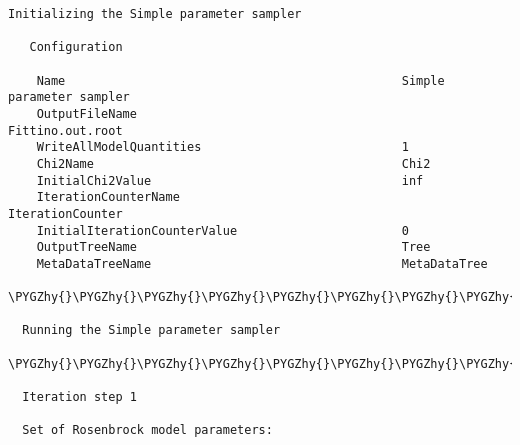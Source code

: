 \documentclass[letterpaper,10pt,english]{sphinxmanual}
\def\PYGZhy{\char`\-}
\begin{document}
\begin{Verbatim}[commandchars=\\\{\}]
  Initializing the Simple parameter sampler

   Configuration

    Name                                               Simple parameter sampler
    OutputFileName                                     Fittino.out.root
    WriteAllModelQuantities                            1
    Chi2Name                                           Chi2
    InitialChi2Value                                   inf
    IterationCounterName                               IterationCounter
    InitialIterationCounterValue                       0
    OutputTreeName                                     Tree
    MetaDataTreeName                                   MetaDataTree

\PYGZhy{}\PYGZhy{}\PYGZhy{}\PYGZhy{}\PYGZhy{}\PYGZhy{}\PYGZhy{}\PYGZhy{}\PYGZhy{}\PYGZhy{}\PYGZhy{}\PYGZhy{}\PYGZhy{}\PYGZhy{}\PYGZhy{}\PYGZhy{}\PYGZhy{}\PYGZhy{}\PYGZhy{}\PYGZhy{}\PYGZhy{}\PYGZhy{}\PYGZhy{}\PYGZhy{}\PYGZhy{}\PYGZhy{}\PYGZhy{}\PYGZhy{}\PYGZhy{}\PYGZhy{}\PYGZhy{}\PYGZhy{}\PYGZhy{}\PYGZhy{}\PYGZhy{}\PYGZhy{}\PYGZhy{}\PYGZhy{}\PYGZhy{}\PYGZhy{}\PYGZhy{}\PYGZhy{}\PYGZhy{}\PYGZhy{}\PYGZhy{}\PYGZhy{}\PYGZhy{}\PYGZhy{}\PYGZhy{}\PYGZhy{}\PYGZhy{}\PYGZhy{}\PYGZhy{}\PYGZhy{}\PYGZhy{}\PYGZhy{}\PYGZhy{}\PYGZhy{}\PYGZhy{}\PYGZhy{}\PYGZhy{}\PYGZhy{}\PYGZhy{}\PYGZhy{}\PYGZhy{}\PYGZhy{}\PYGZhy{}\PYGZhy{}\PYGZhy{}\PYGZhy{}\PYGZhy{}\PYGZhy{}\PYGZhy{}\PYGZhy{}\PYGZhy{}\PYGZhy{}\PYGZhy{}\PYGZhy{}\PYGZhy{}\PYGZhy{}\PYGZhy{}\PYGZhy{}\PYGZhy{}\PYGZhy{}\PYGZhy{}\PYGZhy{}\PYGZhy{}

  Running the Simple parameter sampler

\PYGZhy{}\PYGZhy{}\PYGZhy{}\PYGZhy{}\PYGZhy{}\PYGZhy{}\PYGZhy{}\PYGZhy{}\PYGZhy{}\PYGZhy{}\PYGZhy{}\PYGZhy{}\PYGZhy{}\PYGZhy{}\PYGZhy{}\PYGZhy{}\PYGZhy{}\PYGZhy{}\PYGZhy{}\PYGZhy{}\PYGZhy{}\PYGZhy{}\PYGZhy{}\PYGZhy{}\PYGZhy{}\PYGZhy{}\PYGZhy{}\PYGZhy{}\PYGZhy{}\PYGZhy{}\PYGZhy{}\PYGZhy{}\PYGZhy{}\PYGZhy{}\PYGZhy{}\PYGZhy{}\PYGZhy{}\PYGZhy{}\PYGZhy{}\PYGZhy{}\PYGZhy{}\PYGZhy{}\PYGZhy{}\PYGZhy{}\PYGZhy{}\PYGZhy{}\PYGZhy{}\PYGZhy{}\PYGZhy{}\PYGZhy{}\PYGZhy{}\PYGZhy{}\PYGZhy{}\PYGZhy{}\PYGZhy{}\PYGZhy{}\PYGZhy{}\PYGZhy{}\PYGZhy{}\PYGZhy{}\PYGZhy{}\PYGZhy{}\PYGZhy{}\PYGZhy{}\PYGZhy{}\PYGZhy{}\PYGZhy{}\PYGZhy{}\PYGZhy{}\PYGZhy{}\PYGZhy{}\PYGZhy{}\PYGZhy{}\PYGZhy{}\PYGZhy{}\PYGZhy{}\PYGZhy{}\PYGZhy{}\PYGZhy{}\PYGZhy{}\PYGZhy{}\PYGZhy{}\PYGZhy{}\PYGZhy{}\PYGZhy{}\PYGZhy{}\PYGZhy{}

  Iteration step 1

  Set of Rosenbrock model parameters:


\end{Verbatim}
\end{document}
